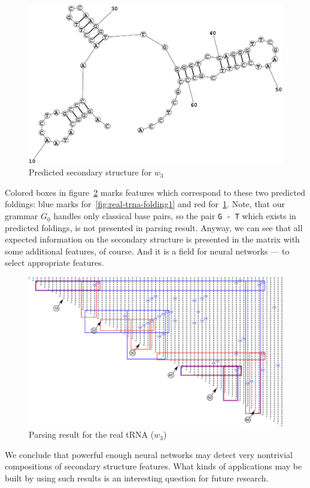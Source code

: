 \documentclass[a4paper,twoside]{article}
\begin{document}
\begin{figure}
\centering
\includegraphics[width=.45\textwidth]{figures/Fold2.pdf}
\caption{Predicted secondary structure for $w_3$}
\label{fig:real-trna-folding2}
\end{figure}

Colored boxes in figure~\ref{fig:real-trna} marks features which correspond to these two predicted foldings: blue marks for~\ref{fig:real-trna-folding1} and red for~\ref{fig:real-trna-folding2}.
Note, that our grammar $G_0$ handles only classical base pairs, so the pair \verb|G - T| which exists in predicted foldings, is not presented in parsing result.
Anyway, we can see that all expected information on the secondary structure is presented in the matrix with some additional features, of course.
And it is a field for neural networks --- to select appropriate features.

\begin{figure}
\centering
\includegraphics[width=.98\textwidth]{figures/0m.pdf}
\caption{Parsing result for the real tRNA ($w_3$)}
\label{fig:real-trna}
\end{figure}

We conclude that powerful enough neural networks may detect very nontrivial compositions of secondary structure features. 
What kinds of applications may be built by using such results is an interesting question for future research.
\end{document}
